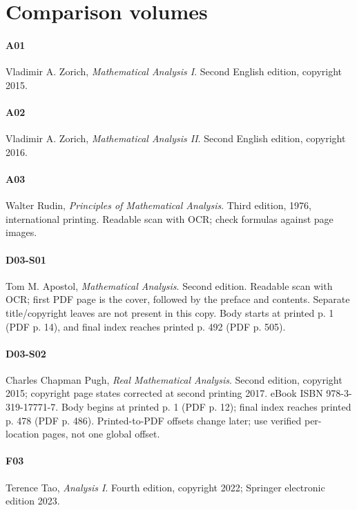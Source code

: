 \documentclass[11pt,oneside,a4paper]{book}
\theoremstyle{definition}
\theoremstyle{remark}
\begin{document}
\section*{Comparison volumes}

\paragraph{A01} Vladimir A. Zorich, \emph{Mathematical Analysis I}. Second English edition, copyright 2015.

\paragraph{A02} Vladimir A. Zorich, \emph{Mathematical Analysis II}. Second English edition, copyright 2016.

\paragraph{A03} Walter Rudin, \emph{Principles of Mathematical Analysis}. Third edition, 1976, international printing. Readable scan with OCR; check formulas against page images.

\paragraph{D03-S01} Tom M. Apostol, \emph{Mathematical Analysis}. Second edition. Readable scan with OCR; first PDF page is the cover, followed by the preface and contents. Separate title/copyright leaves are not present in this copy. Body starts at printed p. 1 (PDF p. 14), and final index reaches printed p. 492 (PDF p. 505).

\paragraph{D03-S02} Charles Chapman Pugh, \emph{Real Mathematical Analysis}. Second edition, copyright 2015; copyright page states corrected at second printing 2017. eBook ISBN 978-3-319-17771-7. Body begins at printed p. 1 (PDF p. 12); final index reaches printed p. 478 (PDF p. 486). Printed-to-PDF offsets change later; use verified per-location pages, not one global offset.

\paragraph{F03} Terence Tao, \emph{Analysis I}. Fourth edition, copyright 2022; Springer electronic edition 2023.
\end{document}
